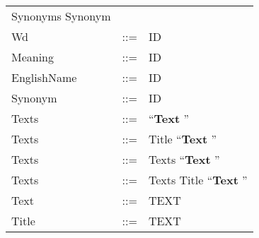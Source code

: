 \begin{longtable}{lrl}
\begin{minipage}[t]{\rulerhs}
    \raggedright
    Synonyms Synonym
  \end{minipage}                                                             \\
Wd          & ::= &
  \begin{minipage}[t]{\rulerhs}
    \raggedright
    ID 
  \end{minipage}                                                             \\
Meaning     & ::= &
  \begin{minipage}[t]{\rulerhs}
    \raggedright
    ID 
  \end{minipage}                                                             \\
EnglishName & ::= &
  \begin{minipage}[t]{\rulerhs}
    \raggedright
    ID 
  \end{minipage}                                                             \\
Synonym     & ::= &
  \begin{minipage}[t]{\rulerhs}
    \raggedright
    ID 
  \end{minipage}                                                             \\
Texts       & ::= &
  \begin{minipage}[t]{\rulerhs}
    \raggedright
    ``{\bf  Text }''
  \end{minipage}                                                             \\
Texts       & ::= &
  \begin{minipage}[t]{\rulerhs}
    \raggedright
    Title ``{\bf  Text }''
  \end{minipage}                                                             \\
Texts       & ::= &
  \begin{minipage}[t]{\rulerhs}
    \raggedright
    Texts ``{\bf  Text }''
  \end{minipage}                                                             \\
Texts       & ::= &
  \begin{minipage}[t]{\rulerhs}
    \raggedright
    Texts Title ``{\bf  Text }''
  \end{minipage}                                                             \\
Text        & ::= &
  \begin{minipage}[t]{\rulerhs}
    \raggedright
    TEXT
  \end{minipage}                                                             \\
Title       & ::= &
  \begin{minipage}[t]{\rulerhs}
    \raggedright
    TEXT
  \end{minipage}                                                             \\
\end{longtable}
